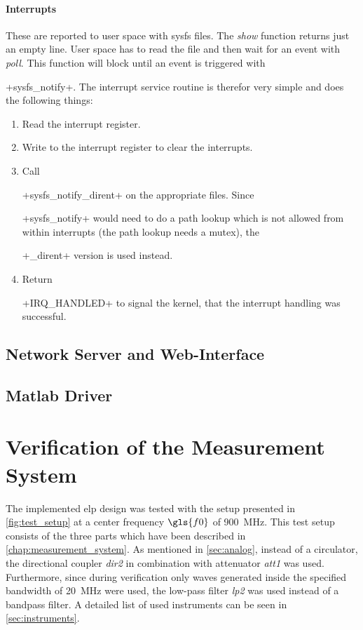 \documentclass[12pt,a4paper,parskip=full,abstract=true,BCOR=12mm,twoside,open=right]{scrreprt}
\newcommand*{\SavedLstInline}{}
\DeclareRobustCommand*{\lstinline}{%
  \ifmmode
    \let\SavedBGroup\bgroup
    \def\bgroup{%
      \let\bgroup\SavedBGroup
      \hbox\bgroup
    }%
  \fi
  \SavedLstInline
}
\def\device#1{\textit{#1}}
\begin{document}
\subsubsection{Interrupts}
These are reported to user space with sysfs files. The \emph{show} function
returns just an empty line. User space has to read the file and then wait for
an event with \emph{poll}. This function will block until an event is
triggered with \lstinline+sysfs_notify+. The interrupt service routine is
therefor very simple and does the following things:
\begin{enumerate}
    \item Read the interrupt register.
    \item Write to the interrupt register to clear the interrupts.
    \item Call \lstinline+sysfs_notify_dirent+ on the appropriate files. Since
        \lstinline+sysfs_notify+ would need to do a path lookup which is not
        allowed from within interrupts (the path lookup needs a mutex), the
        \lstinline+_dirent+ version is used instead.
    \item Return \lstinline+IRQ_HANDLED+ to signal the kernel, that the
        interrupt handling was successful.
\end{enumerate}
\section{Network Server and Web-Interface}
\section{Matlab Driver}
\label{sec:matlab}



\chapter{Verification of the Measurement System}
\label{chap:verification}

The implemented \gls{elp} design was tested with the setup presented in
\cref{fig:test_setup} at a center frequency $\gls{f0}$ of \SI{900}{\mega\hertz}. This test setup consists of the three parts
which have been described in \cref{chap:measurement_system}. As mentioned in
\cref{sec:analog}, instead of a circulator, the directional coupler
\device{dir2} in combination with attenuator \device{att1} was used.
Furthermore, since during verification only waves generated inside
the specified bandwidth of \SI{20}{\mega\hertz} were used, the low-pass filter \device{lp2}
was used instead of a bandpass filter. A detailed list of used
instruments can be seen in \cref{sec:instruments}.
\end{document}
